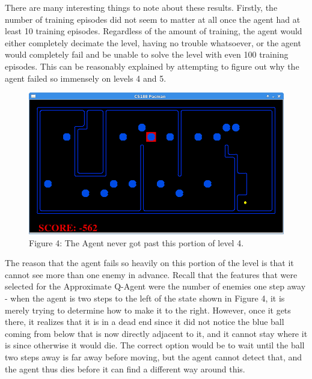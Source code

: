 \documentclass[11pt]{article}
\begin{document}
There are many interesting things to note about these results. Firstly, the number of training episodes did not seem to matter at all once the agent had at least 10 training episodes. Regardless of the amount of training, the agent would either completely decimate the level, having no trouble whatsoever, or the agent would completely fail and be unable to solve the level with even 100 training episodes. This can be reasonably explained by attempting to figure out why the agent failed so immensely on levels 4 and 5.
\begin{figure}[t]
\centering

\includegraphics[scale = .5]{WHGL4.png} \newline \newline
Figure 4: The Agent never got past this portion of level 4.
\end{figure}

The reason that the agent fails so heavily on this portion of the level is that it cannot see more than one enemy in advance. Recall that the features that were selected for the Approximate Q-Agent were the number of enemies one step away - when the agent is two steps to the left of the state shown in Figure 4, it is merely trying to determine how to make it to the right. However, once it gets there, it realizes that it is in a dead end since it did not notice the blue ball coming from below that is now directly adjacent to it, and it cannot stay where it is since otherwise it would die. The correct option would be to wait until the ball two steps away is far away before moving, but the agent cannot detect that, and the agent thus dies before it can find a different way around this. 
\end{document}
